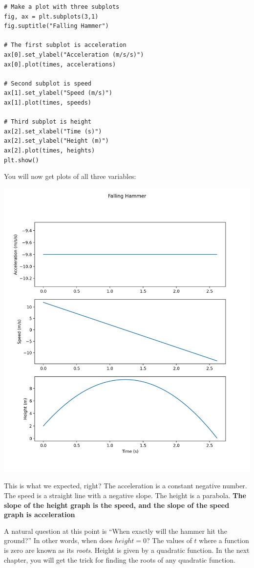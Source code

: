 \begin{Verbatim}
# Make a plot with three subplots
fig, ax = plt.subplots(3,1)
fig.suptitle("Falling Hammer")

# The first subplot is acceleration
ax[0].set_ylabel("Acceleration (m/s/s)")
ax[0].plot(times, accelerations)

# Second subplot is speed
ax[1].set_ylabel("Speed (m/s)")
ax[1].plot(times, speeds)

# Third subplot is height
ax[2].set_xlabel("Time (s)")
ax[2].set_ylabel("Height (m)")
ax[2].plot(times, heights)
plt.show()
\end{Verbatim}

You will now get plots of all three variables:

\includegraphics[width=0.8\linewidth]{stackedplot.png}

This is what we expected, right? The acceleration is a constant negative 
number. The speed is a straight line with a negative slope. The height is a 
parabola. \textbf{The slope of the height graph is the speed, and the slope of the speed graph is acceleration}

A natural question at this point is ``When exactly will the hammer hit the
ground?''  In other words, when does $height = 0$? The values of $t$ where a 
function is zero are known as its \textit{roots}. Height is given by a quadratic 
function. In the next chapter, you will get the trick for finding the roots of 
any quadratic function.
